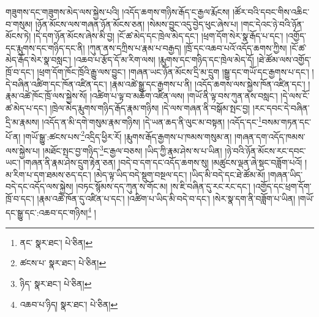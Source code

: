 གཟུགས་དང་གཟུགས་མེད་ལས་སྐྱེས་པའི། །འདོད་ཆགས་གཉིས་རྒོད་ང་རྒྱལ་རྨོངས། །ཚོར་བའི་དབང་གིས་འཆིང་བ་གསུམ། །ཉོན་མོངས་ལས་གཞན་ཉོན་མོངས་ཅན། །སེམས་བྱུང་འདུ་བྱེད་ཕུང་ཞེས་པ། །གང་དེའང་ཉེ་བའི་ཉོན་མོངས་ཏེ། །དེ་དག་ཉོན་མོངས་ཞེས་མི་བྱ། །ངོ་ཚ་མེད་དང་ཁྲེལ་མེད་དང་། །ཕྲག་དོག་སེར་སྣ་རྒོད་པ་དང་། །འགྱོད་དང་རྨུགས་དང་གཉིད་དང་ནི། །ཀུན་ནས་དཀྲིས་པ་རྣམ་པ་བརྒྱད། །ཁྲོ་དང་འཆབ་པའོ་འདོད་ཆགས་ཀྱིས། །ངོ་ཚ་མེད་རྒོད་སེར་སྣ་བསླང་། །འཆབ་པ་རྩོད་དོ་མ་རིག་ལས། །རྨུགས་དང་གཉིད་དང་ཁྲེལ་མེད་དོ། །ཐེ་ཚོམ་ལས་འགྱོད་ཁྲོ་བ་དང་། །ཕྲག་དོག་ཁོང་ཁྲོའི་རྒྱུ་ལས་བྱུང་། །གཞན་ཡང་ཉོན་མོངས་དྲི་མ་དྲུག །སྒྱུ་དང་གཡོ་དང་རྒྱགས་པ་དང་། །དེ་བཞིན་འཚིག་དང་ཁོན་འཛིན་དང་། །རྣམ་འཚེ་སྒྱུ་དང་རྒྱགས་པ་ནི། །འདོད་ཆགས་ལས་སྐྱེས་ཁོན་འཛིན་དང་། །རྣམ་འཚེ་ཁོང་ཁྲོ་ལས་སྐྱེས་སོ། །འཚིག་པ་ལྟ་བ་མཆོག་འཛིན་ལས། །གཡོ་ནི་ལྟ་བས་ཀུན་ནས་བསླང་། །དེ་ལས་ངོ་ཚ་མེད་པ་དང་། །ཁྲེལ་མེད་རྨུགས་གཉིད་རྒོད་རྣམ་གཉིས། །དེ་ལས་གཞན་ནི་བསྒོམ་སྤང་བྱ། །རང་དབང་དེ་བཞིན་དྲི་མ་རྣམས། །འདོད་ན་མི་དགེ་གསུམ་རྣམ་གཉིས། །དེ་ཡན་ཆད་ནི་ལུང་མ་བསྟན། །འདོད་དང་\footnote{ནང་  སྣར་ཐང་།  པེ་ཅིན། }བསམ་གཏན་དང་པོ་ན། །གཡོ་སྒྱུ་:ཚངས་པས་\footnote{ཚངས་པ་  སྣར་ཐང་།  པེ་ཅིན། }འདྲིད་ཕྱིར་རོ། །རྨུགས་རྒོད་རྒྱགས་པ་ཁམས་གསུམ་ན། །གཞན་དག་འདོད་ཁམས་ལས་སྐྱེས་པ། །མཐོང་སྤང་བྱ་གཉིད་\footnote{ཉིད་  སྣར་ཐང་།  པེ་ཅིན། }ང་རྒྱལ་བཅས། །ཡིད་ཀྱི་རྣམ་ཤེས་ས་པ་ཡིན། །ཉེ་བའི་ཉོན་མོངས་རང་དབང་ཡང་། །གཞན་ནི་རྣམ་ཤེས་དྲུག་རྟེན་ཅན། །བདེ་བ་དག་དང་འདོད་ཆགས་སུ། །མཚུངས་ལྡན་ཞེ་སྡང་བཟློག་པའོ། །མ་རིག་པ་དག་ཐམས་ཅད་དང་། །མེད་ལྟ་ཡིད་བདེ་སྡུག་བསྔལ་དང་། །ཡིད་མི་བདེ་དང་ཐེ་ཚོམ་མོ། །གཞན་ཡིད་བདེ་དང་འདོད་ལས་སྐྱེས། །བཏང་སྙོམས་དད་ཀུན་ས་གོང་མ། །ས་ཇི་བཞིན་དུ་རང་རང་དང་། །འགྱོད་དང་ཕྲག་དོག་ཁྲོ་བ་དང་། །རྣམ་འཚེ་ཁོན་དུ་འཛིན་པ་དང་། །འཚིག་པ་ཡིད་མི་བདེ་བ་དང་། །སེར་སྣ་དག་ནི་བཟློག་པ་ཡིན། །གཡོ་དང་སྒྱུ་དང་:འཆབ་དང་གཉིས།\footnote{འཆབ་པ་ཉིད།  སྣར་ཐང་།  པེ་ཅིན། } །
